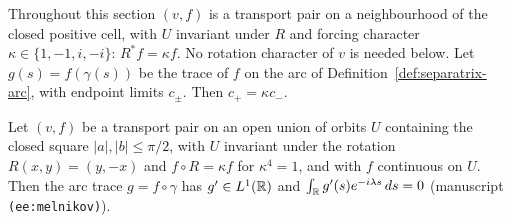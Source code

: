 Throughout this section $(v,f)$ is a transport pair on a neighbourhood of the
closed positive cell, with $U$ invariant under $R$ and forcing character
$\kappa\in\{1,-1,i,-i\}$: $R^*f=\kappa f$. No rotation character of $v$ is needed below. Let
$g(s)=f(\gamma(s))$ be the trace of $f$ on the arc of
Definition~\ref{def:separatrix-arc}, with endpoint limits $c_\pm$. Then
$c_+=\kappa c_-$.

\begin{lemma}
\label{lem:melnikov}
\leanok
Let $(v,f)$ be a transport pair on an open union of orbits $U$ containing the
closed square $|a|,|b|\le\pi/2$, with $U$ invariant under the rotation
$R(x,y)=(y,-x)$ and $f\circ R=\kappa f$ for $\kappa^4=1$, and with
$f$ continuous on $U$. Then the arc trace $g=f\circ\gamma$ has $g'\in L^1(\mathbb{R})$ and
$\int_{\mathbb{R}} g'(s)e^{-i\lambda s}\,ds=0$ (manuscript \texttt{(ee:melnikov)}).
\end{lemma}

